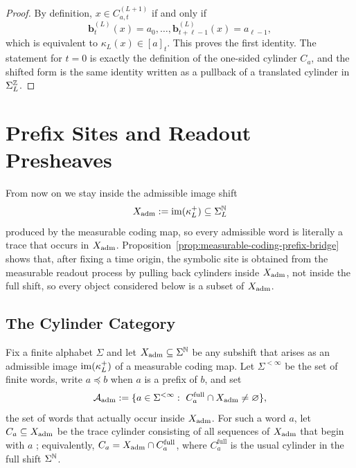 \begin{proof}
By definition, $x\in C_{a,t}^{(L+1)}$ if and only if
\[
\mathbf{b}^{(L)}_t(x)=a_0,\dots,\mathbf{b}^{(L)}_{t+\ell-1}(x)=a_{\ell-1},
\]
which is equivalent to $\kappa_L(x)\in [a]_t$.  This proves the first
identity.  The statement for $t=0$ is exactly the definition of the one-sided
cylinder $C_a$, and the shifted form is the same identity written as a pullback
of a translated cylinder in $\Sigma_L^{\mathbb{Z}}$.
\end{proof}

\section{Prefix Sites and Readout Presheaves}
\label{sec:prefix-sites}

From now on we stay inside the admissible image shift
\[
X_{\mathrm{adm}}:=\operatorname{im}(\kappa_L^+)\subseteq \Sigma_L^{\mathbb{N}}
\]
produced by the measurable coding map, so every admissible word is literally a
trace that occurs in $X_{\mathrm{adm}}$.
Proposition~\ref{prop:measurable-coding-prefix-bridge} shows that, after fixing
a time origin, the symbolic site is obtained from the measurable readout
process by pulling back cylinders inside $X_{\mathrm{adm}}$, not inside the full shift,
so every object considered below is a subset of $X_{\mathrm{adm}}$.

\subsection{The Cylinder Category}

Fix a finite alphabet $\Sigma$ and let $X_{\mathrm{adm}}\subseteq \Sigma^{\mathbb{N}}$ be any
subshift that arises as an admissible image $\operatorname{im}(\kappa_L^+)$ of a measurable
coding map.  Let $\Sigma^{<\infty}$ be the set of finite words, write
$a\preceq b$ when $a$ is a prefix of $b$, and set
\[
\Aadm:=\{a\in\Sigma^{<\infty}:\ C_a^{\mathrm{full}}\cap \Xadm\neq\varnothing\},
\]
the set of words that actually occur inside $X_{\mathrm{adm}}$.  For such a word $a$, let
$C_a\subseteq X_{\mathrm{adm}}$ be the trace cylinder consisting of all sequences of
$X_{\mathrm{adm}}$ that begin with $a$
\cite{LindMarcus1995SymbolicDynamics,Kitchens1998SymbolicDynamics}; equivalently,
$C_a=X_{\mathrm{adm}}\cap C_a^{\mathrm{full}}$, where $C_a^{\mathrm{full}}$ is the usual
cylinder in the full shift $\Sigma^{\mathbb{N}}$.

